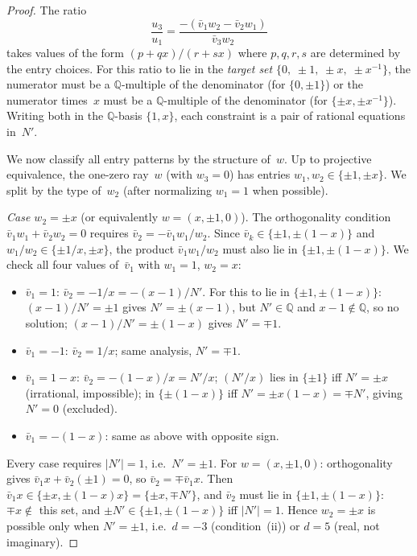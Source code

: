 \documentclass[12pt,a4paper]{article}
\newcommand{\Q}{\mathbb{Q}}
\begin{document}
\begin{proof}
The ratio
\[
  \frac{u_3}{u_1}
  = \frac{-(\bar{v}_1 w_2 - \bar{v}_2 w_1)}{\bar{v}_3 w_2}
\]
takes values of the form $(p + qx)/(r + sx)$ where $p, q, r, s$
are determined by the entry choices.  For this ratio to lie in the
\emph{target set} $\{0,\; \pm 1,\; \pm x,\; \pm x^{-1}\}$,
the numerator must be a $\Q$-multiple of the denominator
(for $\{0, \pm 1\}$) or the numerator times~$x$ must be a
$\Q$-multiple of the denominator (for $\{\pm x, \pm x^{-1}\}$).
Writing both in the $\Q$-basis $\{1, x\}$, each constraint is a
pair of rational equations in~$N'$.

We now classify all entry patterns by the structure of~$w$.
Up to projective equivalence, the one-zero ray~$w$ (with $w_3 = 0$)
has entries $w_1, w_2 \in \{\pm 1, \pm x\}$.  We split by the
type of~$w_2$ (after normalizing $w_1 = 1$ when possible).

\emph{Case $w_2 = \pm x$} (or equivalently $w = (x, \pm 1, 0)$).
The orthogonality condition $\bar{v}_1 w_1 + \bar{v}_2 w_2 = 0$
requires $\bar{v}_2 = -\bar{v}_1 w_1/w_2$.  Since
$\bar{v}_k \in \{\pm 1, \pm(1{-}x)\}$ and
$w_1/w_2 \in \{\pm 1/x, \pm x\}$, the product $\bar{v}_1 w_1/w_2$
must also lie in $\{\pm 1, \pm(1{-}x)\}$.  We check all four
values of~$\bar{v}_1$ with $w_1 = 1$, $w_2 = x$:
\begin{itemize}
\item $\bar{v}_1 = 1$: $\bar{v}_2 = -1/x = -(x{-}1)/N'$.
  For this to lie in $\{\pm 1, \pm(1{-}x)\}$: $(x{-}1)/N' = \pm 1$
  gives $N' = \pm(x{-}1)$, but $N' \in \Q$ and $x{-}1 \notin \Q$,
  so no solution; $(x{-}1)/N' = \pm(1{-}x)$ gives $N' = \mp 1$.
\item $\bar{v}_1 = -1$: $\bar{v}_2 = 1/x$; same analysis, $N' = \mp 1$.
\item $\bar{v}_1 = 1{-}x$: $\bar{v}_2 = -(1{-}x)/x = N'/x$;
  $(N'/x)$ lies in $\{\pm 1\}$ iff $N' = \pm x$ (irrational, impossible);
  in $\{\pm(1{-}x)\}$ iff $N' = \pm x(1{-}x) = \mp N'$, giving
  $N' = 0$ (excluded).
\item $\bar{v}_1 = -(1{-}x)$: same as above with opposite sign.
\end{itemize}
Every case requires $|N'| = 1$, i.e.\ $N' = \pm 1$.  For
$w = (x, \pm 1, 0)$: orthogonality gives
$\bar{v}_1 x + \bar{v}_2(\pm 1) = 0$, so
$\bar{v}_2 = \mp\bar{v}_1 x$.  Then $\bar{v}_1 x \in
\{\pm x, \pm(1{-}x)x\} = \{\pm x, \mp N'\}$, and $\bar{v}_2$
must lie in $\{\pm 1, \pm(1{-}x)\}$: $\mp x \notin$ this set,
and $\pm N' \in \{\pm 1, \pm(1{-}x)\}$ iff $|N'| = 1$.
Hence $w_2 = \pm x$ is possible only when $N' = \pm 1$, i.e.\
$d = -3$ (condition~(ii)) or $d = 5$ (real, not imaginary).


\end{proof}
\end{document}
